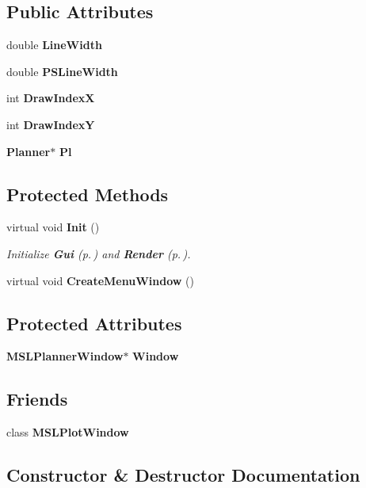 \subsection*{Public Attributes}
\begin{CompactItemize}
\item 
double {\bf Line\-Width}
\item 
double {\bf PSLine\-Width}
\item 
int {\bf Draw\-Index\-X}
\item 
int {\bf Draw\-Index\-Y}
\item 
{\bf Planner}$\ast$ {\bf Pl}
\end{CompactItemize}
\subsection*{Protected Methods}
\begin{CompactItemize}
\item 
virtual void {\bf Init} ()
\begin{CompactList}\small\item\em Initialize {\bf Gui} {\rm (p.\,\pageref{classGui})} and {\bf Render} {\rm (p.\,\pageref{classRender})}.\item\end{CompactList}\item 
virtual void {\bf Create\-Menu\-Window} ()
\end{CompactItemize}
\subsection*{Protected Attributes}
\begin{CompactItemize}
\item 
{\bf MSLPlanner\-Window}$\ast$ {\bf Window}
\end{CompactItemize}
\subsection*{Friends}
\begin{CompactItemize}
\item 
class {\bf MSLPlot\-Window}
\end{CompactItemize}


\subsection{Constructor \& Destructor Documentation}
